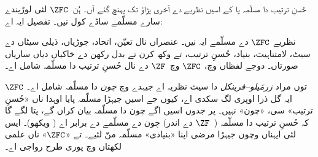 \documentclass[../../../include/open-logic-section]{subfiles}
\begin{document}

حُسنِ ترتیب دا مسلّمہ پا کے اسیں نظریے دے آخری پڑاؤ تک پہنچ گئے آں۔ ہُن~$\ZFC$ لئی لوڑیندے سارے مسلّمے ساڈے کول نیں۔ تفصیل ایہ اے:

\begin{defn}
نظریے $\ZFC$ دے مسلّمے ایہ نیں۔ عنصراں نال تعیّن، اتحاد، جوڑیاں، ذیلی سیٹاں دے سیٹ، لامتناہیت، بنیاد، حُسنِ ترتیب، تے وکھ کرن تے بدل رکھن دے خاکیاں دیاں ساریاں صورتاں۔ دوجے لفظاں وچ، $\ZFC$ وچ~$\ZF$ دے نال حُسنِ ترتیب دا مسلّمہ شامل اے۔
\end{defn}

$\ZFC$ توں مراد \emph{زرمَیلو–فرینکل} دا سیٹ نظریہ اے جیہدے وچ \emph{چون} دا مسلّمہ شامل اے۔ ایہ گل ذرا اوپری لگ سکدی اے، کیوں جے اسیں جیہڑا مسلّمہ پایا اوہدا ناں «حُسنِ ترتیب» سی، «چون» نہیں۔ پر جدوں اسیں اگے {چون} دا مسلّمہ بیان کراں گے، پتا لگے گا کہ حُسنِ ترتیب دا مسلّمہ (~$\ZF$ دے اندر) چون دے مسلّمے دے برابر اے ( ویکھو)۔ ایس لئی ایہناں وچوں جیہڑا مرضی اپنا «بنیادی» مسلّمہ منّ لئیے۔ تے «$\ZFC$» ناں علمی لکھتاں وچ پوری طرح رواجی اے۔
\end{document}
